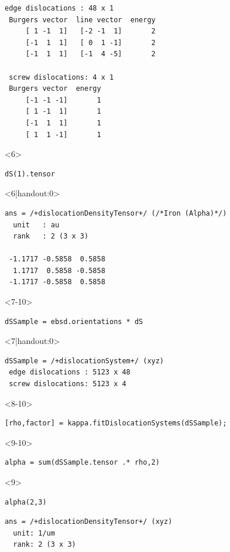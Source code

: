 \documentclass[compress,aspectratio=1610,fleqn]{beamer}
\begin{document}
\begin{frame}[fragile]
\begin{overlayarea}{\textwidth}{\textheight}
\begin{onlyenv}
\begin{lstlisting}[style=output]
 edge dislocations : 48 x 1
 Burgers vector  line vector  energy
     [ 1 -1  1]   [-2 -1  1]       2
     [-1  1  1]   [ 0  1 -1]       2
     [-1  1  1]   [-1  4 -5]       2

 screw dislocations: 4 x 1
 Burgers vector  energy
     [-1 -1 -1]       1
     [ 1 -1  1]       1
     [-1  1  1]       1
     [ 1  1 -1]       1
\end{lstlisting}
\end{onlyenv}
  \begin{onlyenv}<6>
    \vspace{-0.35cm}
\begin{lstlisting}[style=input]
dS(1).tensor
\end{lstlisting}
\end{onlyenv}
\begin{onlyenv}<6|handout:0>
\vspace{-0.4cm}
\begin{lstlisting}[style=output]
ans = /+dislocationDensityTensor+/ (/*Iron (Alpha)*/)
  unit   : au
  rank   : 2 (3 x 3)

 -1.1717 -0.5858  0.5858
  1.1717  0.5858 -0.5858
 -1.1717 -0.5858  0.5858
\end{lstlisting}
\end{onlyenv}
  \begin{onlyenv}<7-10>
    \vspace{-0.35cm}
\begin{lstlisting}[style=input]
dSSample = ebsd.orientations * dS
\end{lstlisting}
\end{onlyenv}
\begin{onlyenv}<7|handout:0>
\vspace{-0.3cm}
\begin{lstlisting}[style=output]
dSSample = /+dislocationSystem+/ (xyz)
 edge dislocations : 5123 x 48
 screw dislocations: 5123 x 4
\end{lstlisting}
\end{onlyenv}
  \begin{onlyenv}<8-10>
    \vspace{-0.3cm}
\begin{lstlisting}[style=input]
[rho,factor] = kappa.fitDislocationSystems(dSSample);
\end{lstlisting}
\end{onlyenv}
  \begin{onlyenv}<9-10>
    \vspace{-0.35cm}
\begin{lstlisting}[style=input]
alpha = sum(dSSample.tensor .* rho,2)
\end{lstlisting}
\end{onlyenv}
\begin{onlyenv}<9>
\begin{lstlisting}[style=input]
alpha(2,3)
\end{lstlisting}
\vspace{-0.4cm}
\begin{lstlisting}[style=output]
ans = /+dislocationDensityTensor+/ (xyz)
  unit: 1/um
  rank: 2 (3 x 3)


\end{lstlisting}
\end{onlyenv}
\end{overlayarea}
\end{frame}
\end{document}

